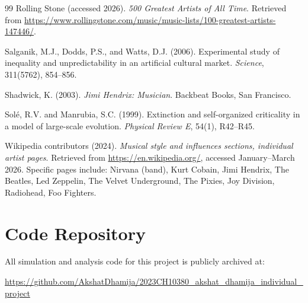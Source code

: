 \documentclass[12pt, a4paper]{article}
\begin{document}
\begin{thebibliography}{99}
Rolling Stone (accessed 2026).
\textit{500 Greatest Artists of All Time}.
Retrieved from
\url{https://www.rollingstone.com/music/music-lists/100-greatest-artists-147446/}.

Salganik, M.J., Dodds, P.S., and Watts, D.J. (2006).
Experimental study of inequality and unpredictability in an
artificial cultural market.
\textit{Science}, 311(5762), 854--856.

Shadwick, K. (2003).
\textit{Jimi Hendrix: Musician}.
Backbeat Books, San Francisco.

Sol\'{e}, R.V. and Manrubia, S.C. (1999).
Extinction and self-organized criticality in a model of large-scale
evolution.
\textit{Physical Review E}, 54(1), R42--R45.

Wikipedia contributors (2024).
\textit{Musical style and influences sections, individual artist
pages}.
Retrieved from \url{https://en.wikipedia.org/},
accessed January--March 2026.
Specific pages include: Nirvana (band), Kurt Cobain,
Jimi Hendrix, The Beatles, Led Zeppelin, The Velvet Underground,
The Pixies, Joy Division, Radiohead, Foo Fighters.

\end{thebibliography}


\appendix
\section{Code Repository}
\label{app:code}

All simulation and analysis code for this project is publicly
archived at:
\begin{center}
  \url{https://github.com/AkshatDhamija/2023CH10380_akshat_dhamija_individual_project
}
\end{center}
\end{document}
